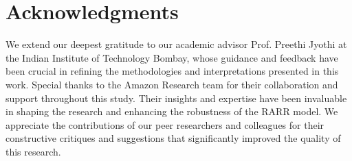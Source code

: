 \documentclass[11pt]{article}
\begin{document}
	\section*{Acknowledgments}
	We extend our deepest gratitude to our academic advisor Prof. Preethi Jyothi at the Indian Institute of Technology Bombay, whose guidance and feedback have been crucial in refining the methodologies and interpretations presented in this work. Special thanks to the Amazon Research team for their collaboration and support throughout this study. Their insights and expertise have been invaluable in shaping the research and enhancing the robustness of the RARR model. We appreciate the contributions of our peer researchers and colleagues for their constructive critiques and suggestions that significantly improved the quality of this research. 
	
	
	
	
\end{document}
